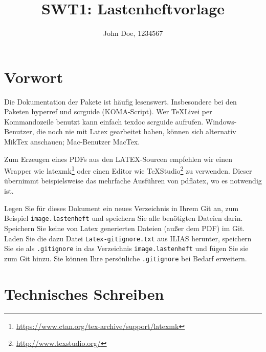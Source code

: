 \documentclass[parskip=full]{scrartcl}
\title{SWT1: Lastenheftvorlage}
\author{John Doe, 1234567}
\begin{document}
\maketitle

%
%
\section{Vorwort}
Die Dokumentation der Pakete ist häufig lesenswert.
Insbesondere bei den Paketen hyperref und scrguide (KOMA-Script).
Wer TeXLivei per Kommandozeile benutzt kann einfach texdoc scrguide aufrufen.
Windows-Benutzer, die noch nie mit Latex gearbeitet haben, können sich alternativ MikTex anschauen; Mac-Benutzer MacTex.

Zum Erzeugen eines PDFs aus den LATEX-Sourcen empfehlen wir einen Wrapper wie latexmk\footnote{\url{https://www.ctan.org/tex-archive/support/latexmk}} oder einen Editor wie TeXStudio\footnote{\url{http://www.texstudio.org/}} zu verwenden.
Dieser übernimmt beispielsweise das mehrfache Ausführen von pdflatex, wo es notwendig ist.

Legen Sie für dieses Dokument ein neues Verzeichnis in Ihrem Git an, zum Beispiel \texttt{image.lastenheft} und speichern Sie alle benötigten Dateien darin.
Speichern Sie keine von Latex generierten Dateien (außer dem PDF) im Git.
Laden Sie die dazu Datei \texttt{Latex-gitignore.txt} aus ILIAS herunter, speichern Sie sie als \texttt{.gitignore} in das Verzeichnis \texttt{image.lastenheft} und fügen Sie sie zum Git hinzu.
Sie können Ihre persönliche \texttt{.gitignore} bei Bedarf erweitern.

\section{Technisches Schreiben}
\end{document}
